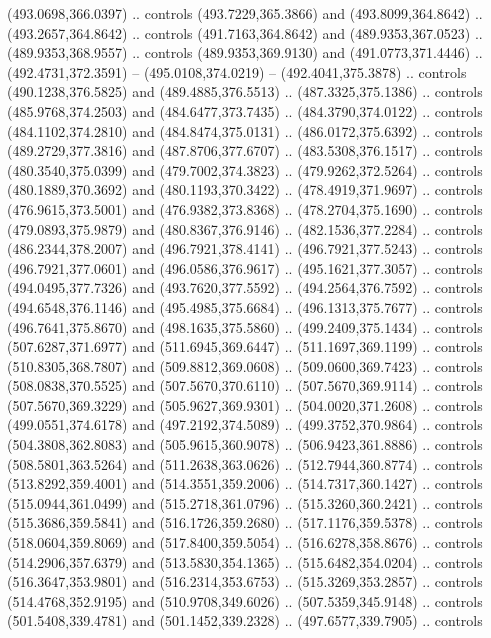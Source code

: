 \begin{scope}[cm={{1.25,0.0,0.0,-1.25,(0.0,743.43331)}}]
    (493.0698,366.0397) .. controls (493.7229,365.3866) and (493.8099,364.8642) ..
    (493.2657,364.8642) .. controls (491.7163,364.8642) and (489.9353,367.0523) ..
    (489.9353,368.9557) .. controls (489.9353,369.9130) and (491.0773,371.4446) ..
    (492.4731,372.3591) -- (495.0108,374.0219) -- (492.4041,375.3878) .. controls
    (490.1238,376.5825) and (489.4885,376.5513) .. (487.3325,375.1386) .. controls
    (485.9768,374.2503) and (484.6477,373.7435) .. (484.3790,374.0122) .. controls
    (484.1102,374.2810) and (484.8474,375.0131) .. (486.0172,375.6392) .. controls
    (489.2729,377.3816) and (487.8706,377.6707) .. (483.5308,376.1517) .. controls
    (480.3540,375.0399) and (479.7002,374.3823) .. (479.9262,372.5264) .. controls
    (480.1889,370.3692) and (480.1193,370.3422) .. (478.4919,371.9697) .. controls
    (476.9615,373.5001) and (476.9382,373.8368) .. (478.2704,375.1690) .. controls
    (479.0893,375.9879) and (480.8367,376.9146) .. (482.1536,377.2284) .. controls
    (486.2344,378.2007) and (496.7921,378.4141) .. (496.7921,377.5243) .. controls
    (496.7921,377.0601) and (496.0586,376.9617) .. (495.1621,377.3057) .. controls
    (494.0495,377.7326) and (493.7620,377.5592) .. (494.2564,376.7592) .. controls
    (494.6548,376.1146) and (495.4985,375.6684) .. (496.1313,375.7677) .. controls
    (496.7641,375.8670) and (498.1635,375.5860) .. (499.2409,375.1434) .. controls
    (507.6287,371.6977) and (511.6945,369.6447) .. (511.1697,369.1199) .. controls
    (510.8305,368.7807) and (509.8812,369.0608) .. (509.0600,369.7423) .. controls
    (508.0838,370.5525) and (507.5670,370.6110) .. (507.5670,369.9114) .. controls
    (507.5670,369.3229) and (505.9627,369.9301) .. (504.0020,371.2608) .. controls
    (499.0551,374.6178) and (497.2192,374.5089) .. (499.3752,370.9864) .. controls
    (504.3808,362.8083) and (505.9615,360.9078) .. (506.9423,361.8886) .. controls
    (508.5801,363.5264) and (511.2638,363.0626) .. (512.7944,360.8774) .. controls
    (513.8292,359.4001) and (514.3551,359.2006) .. (514.7317,360.1427) .. controls
    (515.0944,361.0499) and (515.2718,361.0796) .. (515.3260,360.2421) .. controls
    (515.3686,359.5841) and (516.1726,359.2680) .. (517.1176,359.5378) .. controls
    (518.0604,359.8069) and (517.8400,359.5054) .. (516.6278,358.8676) .. controls
    (514.2906,357.6379) and (513.5830,354.1365) .. (515.6482,354.0204) .. controls
    (516.3647,353.9801) and (516.2314,353.6753) .. (515.3269,353.2857) .. controls
    (514.4768,352.9195) and (510.9708,349.6026) .. (507.5359,345.9148) .. controls
    (501.5408,339.4781) and (501.1452,339.2328) .. (497.6577,339.7905) .. controls

\end{scope}
